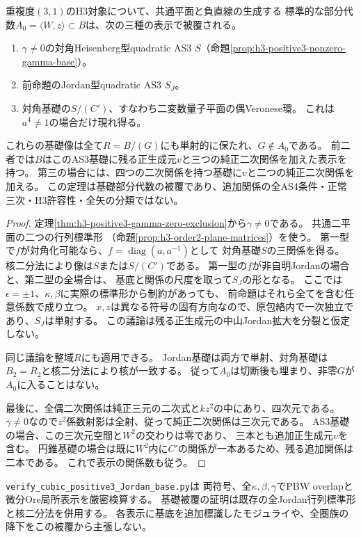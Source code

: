 \begin{theorem}[全$(3,1)$H3候補の基礎部分代数の被覆]
\label{thm:h3-positive3-canonical-base-coverage}
重複度$(3,1)$のH3対象について、共通平面と負直線の生成する
標準的な部分代数$A_0=\langle W,z\rangle\subset B$は、次の三種の表示で被覆される。
\begin{enumerate}
\item $\gamma\ne0$の対角Heisenberg型quadratic AS3
 $S$（命題\ref{prop:h3-positive3-nonzero-gamma-base}）。
\item 前命題のJordan型quadratic AS3 $S_J$。
\item 対角基礎の$S/(C')$、すなわち二変数量子平面の偶Veronese環。
 これは$a^4\ne1$の場合だけ現れ得る。
\end{enumerate}
これらの基礎像は全て$R=B/(G)$にも単射的に保たれ、$G\notin A_0$である。
前二者では$B$はこのAS3基礎に残る正生成元$v$と三つの純正二次関係を加えた表示を持つ。
第三の場合には、四つの二次関係を持つ基礎に$v$と二つの純正二次関係を加える。
この定理は基礎部分代数の被覆であり、追加関係の全AS4条件・正常三次・H3許容性・全矢の分類ではない。
\end{theorem}
\begin{proof}
定理\ref{thm:h3-positive3-gamma-zero-exclusion}から$\gamma\ne0$である。
共通二平面の二つの行列標準形
（命題\ref{prop:h3-order2-plane-matrices}）を使う。
第一型で$f$が対角化可能なら、$f=\operatorname{diag}(a,a^{-1})$として
対角基礎$S$の三関係を得る。
核二分法により像は$S$または$S/(C')$である。
第一型の$f$が非自明Jordanの場合と、第二型の全場合は、
基底と関係の尺度を取って$S_J$の形となる。
ここでは$\epsilon=\pm1$、$\kappa,\beta$に実際の標準形から制約があっても、
前命題はそれら全てを含む任意係数で成り立つ。
$x,z$は異なる符号の固有方向なので、原包絡内で一次独立であり、$S_J$は単射する。
この議論は残る正生成元の中山Jordan拡大を分裂と仮定しない。

同じ議論を整域$R$にも適用できる。
Jordan基礎は両方で単射、対角基礎は$B_2=R_2$と核二分法により核が一致する。
従って$A_0$は切断後も埋まり、非零$G$が$A_0$に入ることはない。

最後に、全偶二次関係は純正三元の二次式と$kz^2$の中にあり、四次元である。
$\gamma\ne0$なので$z^2$係数射影は全射、従って純正二次関係は三次元である。
AS3基礎の場合、この三次元空間と$W^2$の交わりは零であり、
三本とも追加正生成元$v$を含む。
円錐基礎の場合は既に$W^2$内に$C'$の関係が一本あるため、残る追加関係は二本である。
これで表示の関係数も従う。
\end{proof}

\texttt{verify\_cubic\_positive3\_Jordan\_base.py}は
両符号、全$\kappa,\beta,\gamma$でPBW overlapと微分Ore局所表示を厳密検算する。
基礎被覆の証明は既存の全Jordan行列標準形と核二分法を併用する。
各表示に基底を追加標識したモジュライや、全圏族の降下をこの被覆から主張しない。
